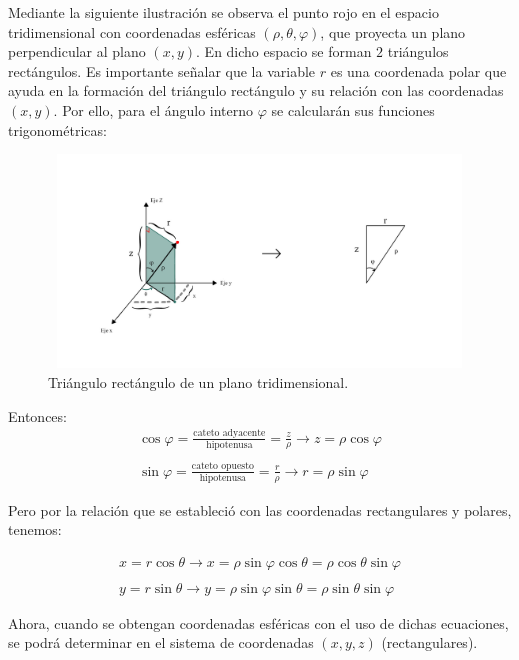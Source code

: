 Mediante la siguiente ilustración se observa el punto rojo en el espacio tridimensional con coordenadas esféricas ${\left(\rho,\theta,\varphi\right)}$, que proyecta un plano perpendicular al plano ${\left(x,y\right)}$. En dicho espacio se forman ${2}$ triángulos rectángulos. Es importante señalar que la variable ${r}$ es una coordenada polar que ayuda en la formación del triángulo rectángulo y su relación con las coordenadas ${\left(x,y\right)}$. Por ello, para el ángulo interno ${\varphi}$ se calcularán sus funciones trigonométricas:

\begin{figure}[H]
  \centering
  \includegraphics[width=11.17cm, height=5.67cm]{img/graph/coord_esf_2_rect_1.jpg}
  \caption{Triángulo rectángulo de un plano tridimensional.}
  \label{relacion_de_coordenadas}
\end{figure}

Entonces:
\begin{eqnarray*}
  \cos \varphi = \frac{\text{cateto adyacente}}{\text{hipotenusa}} = \frac{z}{\rho} \rightarrow z = \rho \cos \varphi\\\\
  \sin \varphi = \frac{\text{cateto opuesto}}{\text{hipotenusa}} = \frac{r}{\rho} \rightarrow r = \rho \sin \varphi
\end{eqnarray*}

\vspace{4mm}
Pero por la relación que se estableció con las coordenadas rectangulares y polares, tenemos:

\begin{eqnarray*}
  x = r \cos \theta \rightarrow x = \rho \sin \varphi \cos \theta = \rho \cos \theta \sin \varphi\\\\
  y = r \sin \theta \rightarrow y = \rho \sin \varphi \sin \theta = \rho \sin \theta \sin \varphi
\end{eqnarray*}

\vspace{4mm}
Ahora, cuando se obtengan coordenadas esféricas con el uso de dichas ecuaciones, se podrá determinar en el sistema de coordenadas $(x,y,z)$ (rectangulares). \cite{matefacil}
